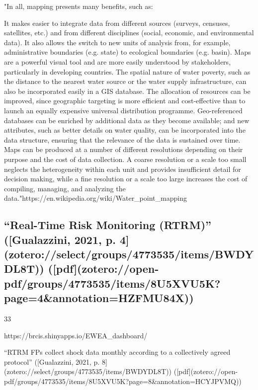 {%
"In all, mapping presents many benefits, such as:

It makes easier to integrate data from different sources (surveys, censuses, satellites, etc.) and from different disciplines (social, economic, and environmental data). It also allows the switch to new units of analysis from, for example, administrative boundaries (e.g. state) to ecological boundaries (e.g. basin).
Maps are a powerful visual tool and are more easily understood by stakeholders, particularly in developing countries.
The spatial nature of water poverty, such as the distance to the nearest water source or the water supply infrastructure, can also be incorporated easily in a GIS database.
The allocation of resources can be improved, since geographic targeting is more efficient and cost-effective than to launch an equally expensive universal distribution programme.
Geo-referenced databases can be enriched by additional data as they become available; and new attributes, such as better details on water quality, can be incorporated into the data structure, ensuring that the relevance of the data is sustained over time.
Maps can be produced at a number of different resolutions depending on their purpose and the cost of data collection. A coarse resolution or a scale too small neglects the heterogeneity within each unit and provides insufficient detail for decision making, while a fine resolution or a scale too large increases the cost of compiling, managing, and analyzing the data."https://en.wikipedia.org/wiki/Water_point_mapping

\subsection{“Real-Time Risk Monitoring (RTRM)” ([Gualazzini, 2021, p. 4](zotero://select/groups/4773535/items/BWDYDL8T)) ([pdf](zotero://open-pdf/groups/4773535/items/8U5XVU5K?page=4&annotation=HZFMU84X))}33

https://brcis.shinyapps.io/EWEA_dashboard/

“RTRM FPs collect shock data monthly according to a collectively agreed protocol” ([Gualazzini, 2021, p. 8](zotero://select/groups/4773535/items/BWDYDL8T)) ([pdf](zotero://open-pdf/groups/4773535/items/8U5XVU5K?page=8&annotation=HCYJPVMQ))

}
